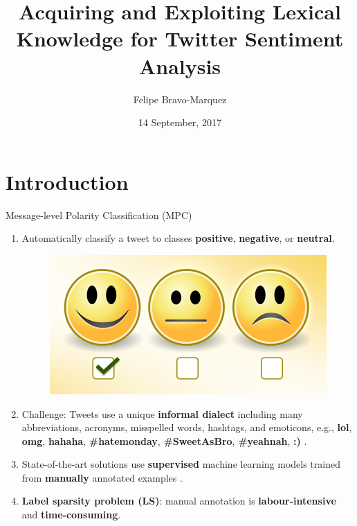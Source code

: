 \documentclass[handout]{beamer}
\title{Acquiring and Exploiting Lexical Knowledge for Twitter Sentiment Analysis}
\author[Felipe Bravo Márquez]{\footnotesize
 \textcolor[rgb]{0.00,0.00,1.00}{Felipe Bravo-Marquez}}
\institute{Department of Computer Science, University of Waikato }
\date{14 September, 2017}
\begin{document}
\begin{frame}
\titlepage

\end{frame}

\section{Introduction}


\begin{frame}{Message-level Polarity Classification (MPC)}
\begin{scriptsize}
  \begin{enumerate}
   \item Automatically classify a tweet to classes \textcolor[rgb]{0.00,0.00,1.00}{\textbf{positive}}, \textcolor[rgb]{1.00,0.00,0.00}{\textbf{negative}}, or \textcolor[rgb]{0.00,1.00,0.00}{\textbf{neutral}}. 
   
     \begin{figure}[h]
        	\includegraphics[scale = 0.15]{pics/sent.png}
        \end{figure}
   \item Challenge: Tweets use a unique \textbf{informal dialect} including many abbreviations, acronyms, misspelled words, hashtags, and emoticons, e.g., \textbf{lol}, \textbf{omg}, \textbf{hahaha}, \textbf{\#hatemonday}, \textbf{\#SweetAsBro}, \textbf{\#yeahnah}, \textbf{:)} .
   \item State-of-the-art solutions use \textbf{supervised} machine learning models trained from \textbf{manually} annotated examples \cite{NRCJAIR14}.
   \item \textbf{Label sparsity problem (LS)}: manual annotation is \textbf{labour-intensive} and \textbf{time-consuming}. 
  \end{enumerate} 
\end{scriptsize}

\end{frame}
\end{document}
